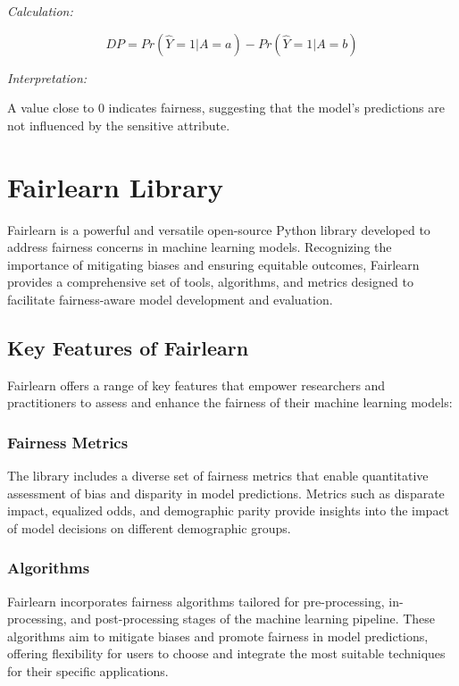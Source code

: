 \documentclass[12pt,a4paper,openright,twoside]{book}
\begin{document}
\emph{Calculation:}

\[ DP = Pr(\hat{Y} = 1|A = a) - Pr(\hat{Y} = 1|A = b) \]

\emph{Interpretation:}

A value close to 0 indicates fairness, suggesting that the model's predictions are not influenced by the sensitive attribute.

\newpage
\section{Fairlearn Library}
\label{section:fairlearn}

Fairlearn is a powerful and versatile open-source Python library developed to address fairness concerns in machine learning models. Recognizing the importance of mitigating biases and ensuring equitable outcomes, Fairlearn provides a comprehensive set of tools, algorithms, and metrics designed to facilitate fairness-aware model development and evaluation.

\subsection{Key Features of Fairlearn}

Fairlearn offers a range of key features that empower researchers and practitioners to assess and enhance the fairness of their machine learning models:

\subsubsection{Fairness Metrics}

The library includes a diverse set of fairness metrics that enable quantitative assessment of bias and disparity in model predictions. Metrics such as disparate impact, equalized odds, and demographic parity provide insights into the impact of model decisions on different demographic groups.

\subsubsection{Algorithms}

Fairlearn incorporates fairness algorithms tailored for pre-processing, in-processing, and post-processing stages of the machine learning pipeline. These algorithms aim to mitigate biases and promote fairness in model predictions, offering flexibility for users to choose and integrate the most suitable techniques for their specific applications.
\end{document}
